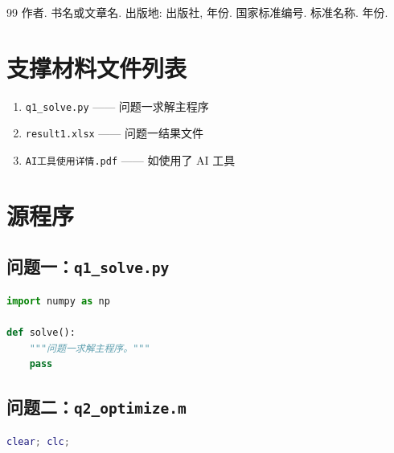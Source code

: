 \documentclass[UTF8,12pt,a4paper,fontset=windows]{ctexart}
\numberwithin{equation}{section}
\begin{document}
\begin{thebibliography}{99}
 作者. 书名或文章名. 出版地: 出版社, 年份.
 国家标准编号. 标准名称. 年份.
\end{thebibliography}

\newpage
\appendix
\section{支撑材料文件列表}
\begin{enumerate}[label=(\arabic*),itemsep=2pt]
  \item \texttt{q1\_solve.py} —— 问题一求解主程序
  \item \texttt{result1.xlsx} —— 问题一结果文件
  \item \texttt{AI工具使用详情.pdf} —— 如使用了 AI 工具
\end{enumerate}

\section{源程序}
\subsection{问题一：\texttt{q1\_solve.py}}
\begin{lstlisting}[language=Python]
import numpy as np

def solve():
    """问题一求解主程序。"""
    pass
\end{lstlisting}

\subsection{问题二：\texttt{q2\_optimize.m}}
\begin{lstlisting}[language=Matlab]
% 问题二：最优参数搜索
clear; clc;
\end{lstlisting}
\end{document}
